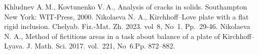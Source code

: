 



\begin{thebibliography}{99}
Khludnev A.\,M., Kovtunenko V.\,A., Analysis of cracks in solids.  Southampton New York: WIT-Press, 2000.
Nikolaeva N. A., Kirchhoff--Love plate with a flat rigid inclusion. Chelyab. Fiz.-Mat. Zh. 2023. vol~8, No~1. Pp.~29-46.
Nikolaeva N. A., Method of fictitious areas in a task about balance of a plate of Kirchhoff–Lyava. J. Math. Sci. 2017. vol.~221, No~6.Pp. 872–882.

\end{thebibliography}






%


